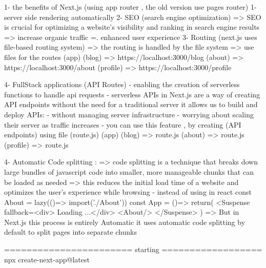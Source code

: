 1- the benefits of Next.js  (using app router , the old version use pages router)
        1- server side rendering automatically
        2- SEO (search engine optimization) => SEO is crucial for optimizing a website's visibility and ranking in search engine results
                => increase organic traffic
                =. enhanced user experience
        3- Routing (next.js uses file-based routing system)
                => the routing is handled by the file system
                => use files for the routes 
                (app)
                    (blog) => https://localhost:3000/blog
                    (about) => https://localhost:3000/about
                    (profile) => https://localhost:3000/profile

        4- FullStack applications (API Routes)
            - enabling the creation of serverless functions to handle api requests
            - serverless APIs in Next.js are a way of creating API endpoints without the need for a traditional server 
                it allows us to build and deploy APIs:
                        - without managing server infrastructure
                        - worrying about scaling their server as traffic increases
            - you can use this feature , by creating (API endpoints) using file (route.js)
                    (app)
                        (blog) => route.js
                        (about) => route.js
                        (profile) => route.js

        4- Automatic Code splitting :
                => code splitting is a technique that breaks down large bundles of javascript code into smaller,
                    more manageable chunks that can be loaded as needed
                => this reduces the initial load time of a website and optimizes the user's experience while browsing
                    - instead of using in react 
                            const About = lazy(()=> import('./About'))
                            const App = ()=> {
                                return(
                                    <Suspense fallback={<div> Loading ...</div>}
                                        <About/>
                                    </Suspense>
                                )
                            }
                => But in Next.js this process is entirely Automatic
                    it uses automatic code splitting by default to split pages into separate chunks

======================= starting    ==================
npx create-next-app@latest



